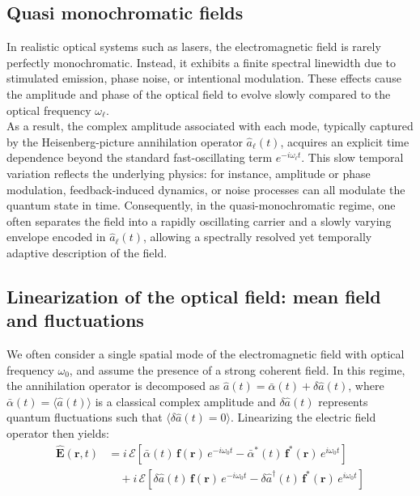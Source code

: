 \subsection*{Quasi monochromatic fields } 
In realistic optical systems such as lasers, the electromagnetic field is rarely perfectly monochromatic. Instead, it exhibits a finite spectral linewidth due to stimulated emission, phase noise, or intentional modulation. These effects cause the amplitude and phase of the optical field to evolve slowly compared to the optical frequency $\omega_\ell$. \\

\noindent As a result, the complex amplitude associated with each mode, typically captured by the Heisenberg-picture annihilation operator $\hat{a}_\ell(t)$, acquires an explicit time dependence beyond the standard fast-oscillating term $e^{-i\omega_\ell t}$. This slow temporal variation reflects the underlying physics: for instance, amplitude or phase modulation, feedback-induced dynamics, or noise processes can all modulate the quantum state in time. Consequently, in the quasi-monochromatic regime, one often separates the field into a rapidly oscillating carrier and a slowly varying envelope encoded in $\hat{a}_\ell(t)$, allowing a spectrally resolved yet temporally adaptive description of the field. \\

\subsection*{Linearization of the optical field: mean field and fluctuations}

We often consider a single spatial mode of the electromagnetic field with optical frequency \(\omega_0\), and assume the presence of a strong coherent field. In this regime, the annihilation operator is decomposed as \(\hat{a}(t) = \bar{\alpha}(t) + \delta\hat{a}(t)\), where \(\bar{\alpha}(t)=\langle \hat{a}(t)\rangle\) is a classical complex amplitude and \(\delta\hat{a}(t)\) represents quantum fluctuations such that \(\langle \delta \hat{a}(t)=0\rangle\).
Linearizing the electric field operator then yields:
\begin{equation}
\begin{aligned}
\hat{\mathbf{E}}(\mathbf{r}, t) 
&= i \, \mathcal{E} \left[ \bar{\alpha}(t)\, \mathbf{f}(\mathbf{r})\, e^{-i \omega_0 t} 
- \bar{\alpha}^*(t)\, \mathbf{f}^*(\mathbf{r})\, e^{i \omega_0 t} \right] \\
&\quad + i \, \mathcal{E} \left[ \delta \hat{a}(t)\, \mathbf{f}(\mathbf{r})\, e^{-i \omega_0 t}
- \delta \hat{a}^\dagger(t)\, \mathbf{f}^*(\mathbf{r})\, e^{i \omega_0 t} \right]
\end{aligned}
\end{equation}


